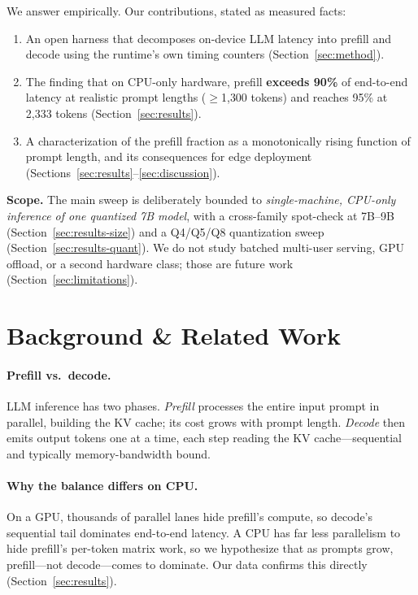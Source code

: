 \documentclass[10pt,twocolumn]{article}
\begin{document}
We answer empirically. Our contributions, stated as measured facts:
\begin{enumerate}
  \item An open harness that decomposes on-device LLM latency into prefill
        and decode using the runtime's own timing counters
        (Section~\ref{sec:method}).
  \item The finding that on CPU-only hardware, prefill \textbf{exceeds
        90\%} of end-to-end latency at realistic prompt lengths
        ($\geq$1{,}300 tokens) and reaches 95\% at 2{,}333 tokens
        (Section~\ref{sec:results}).
  \item A characterization of the prefill fraction as a monotonically
        rising function of prompt length, and its consequences for edge
        deployment (Sections~\ref{sec:results}--\ref{sec:discussion}).
\end{enumerate}

\noindent\textbf{Scope.} The main sweep is deliberately bounded to
\emph{single-machine, CPU-only inference of one quantized 7B model}, with a
cross-family spot-check at 7B--9B (Section~\ref{sec:results-size}) and a
Q4/Q5/Q8 quantization sweep (Section~\ref{sec:results-quant}). We do not
study batched multi-user serving, GPU offload, or a second hardware class;
those are future work (Section~\ref{sec:limitations}).

\section{Background \& Related Work}
\label{sec:background}

\paragraph{Prefill vs.\ decode.}
LLM inference has two phases. \emph{Prefill} processes the entire input
prompt in parallel, building the KV cache; its cost grows with prompt
length. \emph{Decode} then emits output tokens one at a time, each step
reading the KV cache---sequential and typically memory-bandwidth bound.

\paragraph{Why the balance differs on CPU.}
On a GPU, thousands of parallel lanes hide prefill's compute, so decode's
sequential tail dominates end-to-end latency. A CPU has far less
parallelism to hide prefill's per-token matrix work, so we hypothesize
that as prompts grow, prefill---not decode---comes to dominate. Our data
confirms this directly (Section~\ref{sec:results}).
\end{document}
